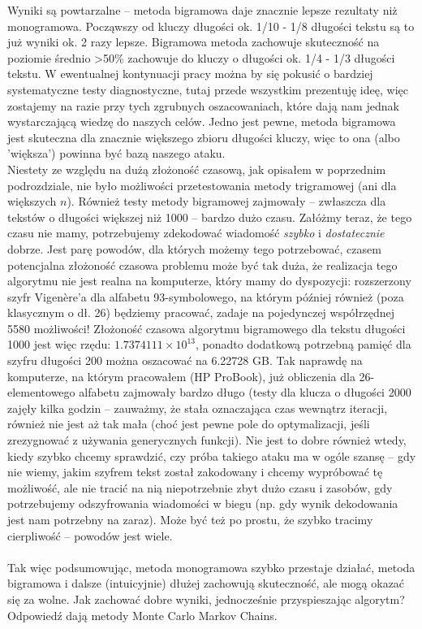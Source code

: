 \documentclass[a4paper]{article}
\theoremstyle{defn}
\theoremstyle{theorem}
\theoremstyle{lemma}
\theoremstyle{cor}
\theoremstyle{fact}
\begin{document}
Wyniki są powtarzalne – metoda bigramowa daje znacznie lepsze rezultaty niż monogramowa. Począwszy od kluczy długości ok. 1/10 - 1/8 długości tekstu są to już wyniki ok. 2 razy lepsze. Bigramowa metoda zachowuje skuteczność na poziomie średnio >50\% zachowuje do kluczy o długości ok. 1/4 - 1/3  długości tekstu. W ewentualnej kontynuacji pracy można by się pokusić o bardziej systematyczne testy diagnostyczne, tutaj przede wszystkim prezentuję ideę, więc zostajemy na razie przy tych zgrubnych oszacowaniach, które dają nam jednak wystarczającą wiedzę do naszych celów. Jedno jest pewne, metoda bigramowa jest skuteczna dla znacznie większego zbioru długości kluczy, więc to ona (albo 'większa') powinna być bazą naszego ataku.\\
Niestety ze względu na dużą złożoność czasową, jak opisałem w poprzednim podrozdziale, nie było możliwości przetestowania metody trigramowej (ani dla większych $n$). Również testy metody bigramowej zajmowały – zwłaszcza dla tekstów o długości większej niż 1000 – bardzo dużo czasu. Załóżmy teraz, że tego czasu nie mamy, potrzebujemy zdekodować wiadomość \textit{szybko} i \textit{dostatecznie} dobrze. Jest parę powodów, dla których możemy tego potrzebować, czasem potencjalna złożoność czasowa problemu może być tak duża, że realizacja tego algorytmu nie jest realna na komputerze, który mamy do dyspozycji: rozszerzony szyfr Vigenère'a dla alfabetu 93-symbolowego, na którym później również (poza klasycznym o dł. 26) będziemy pracować, zadaje na pojedynczej współrzędnej 5580 możliwości! Złożoność czasowa algorytmu bigramowego dla tekstu długości 1000 jest więc rzędu: $1.7374111 × 10^{13}$, ponadto dodatkową potrzebną pamięć dla szyfru długości 200 można oszacować na 6.22728 GB. Tak naprawdę na komputerze, na którym pracowałem (HP ProBook), już obliczenia dla 26-elementowego alfabetu zajmowały bardzo długo (testy dla klucza o długości 2000 zajęły kilka godzin – zauważmy, że stała oznaczająca czas wewnątrz iteracji, również nie jest aż tak mała (choć jest pewne pole do optymalizacji, jeśli zrezygnować z używania generycznych funkcji). Nie jest to dobre również wtedy, kiedy szybko chcemy sprawdzić, czy próba takiego ataku ma w ogóle szansę – gdy nie wiemy, jakim szyfrem tekst został zakodowany i chcemy wypróbować tę możliwość, ale nie tracić na nią niepotrzebnie zbyt dużo czasu i zasobów, gdy potrzebujemy odszyfrowania wiadomości w biegu (np. gdy wynik dekodowania jest nam potrzebny na zaraz). Może być też po prostu, że szybko tracimy cierpliwość – powodów jest wiele.\\\\
Tak więc podsumowując, metoda monogramowa szybko przestaje działać, metoda bigramowa i dalsze (intuicyjnie) dłużej zachowują skuteczność, ale mogą okazać się za wolne. Jak zachować dobre wyniki, jednocześnie przyspieszając algorytm? Odpowiedź dają metody Monte Carlo Markov Chains.
\\
\end{document}
